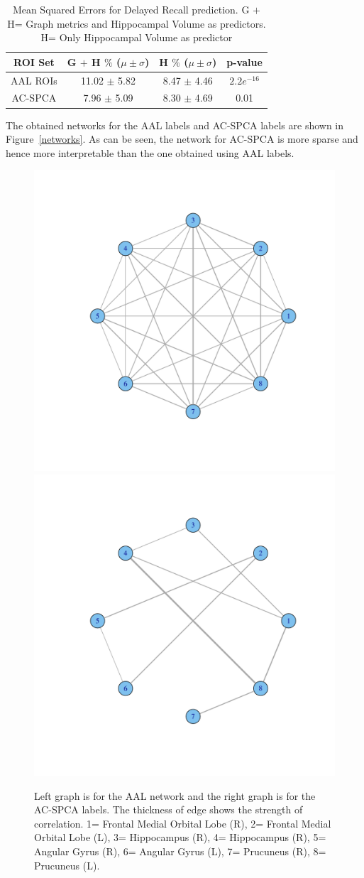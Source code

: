 \documentclass{article}
\begin{document}
\begin{table}
\begin{center}
\begin{small}
\begin{tabular}{|c|c|c|c|}
\hline
 ROI Set& G $+$ H $\%$ ($\mu\pm\sigma$) & H  $\%$ ($\mu\pm\sigma$) & p-value  \\
\hline
AAL ROIs & 11.02 $\pm$ 5.82 &   8.47 $\pm $ 4.46 & $2.2e^{-16}$\\
AC-SPCA &  7.96 $\pm$ 5.09 & 8.30 $\pm$ 4.69    & 0.01 \\
   \hline
\end{tabular}
\end{small}
\vspace{0.1in}
\caption{Mean Squared Errors for Delayed Recall prediction.  G $+$ H= Graph metrics and Hippocampal Volume as predictors. H= Only Hippocampal Volume as predictor }
\end{center}
\end{table}


The obtained networks for the AAL labels and AC-SPCA labels are shown in Figure~\ref{networks}. As can be seen, the network for AC-SPCA is more sparse and hence more interpretable than the one obtained using AAL labels.  


\begin{figure}
\begin{center}
\includegraphics[width=0.45\linewidth]{graphaal.pdf} 
\includegraphics[width=0.45\linewidth]{graphacspca.pdf} 
\end{center}
\vspace{-0.2in}
\caption{Left graph is for the AAL network and the right graph is for the AC-SPCA labels. The thickness of edge shows the strength of correlation. 1= Frontal Medial Orbital Lobe (R), 2= Frontal Medial Orbital Lobe (L), 3= Hippocampus (R), 4= Hippocampus (R), 5= Angular Gyrus (R), 6= Angular Gyrus (L), 7= Prucuneus (R), 8= Prucuneus (L).   }
\label{networksi}
\end{figure}
\end{document}
